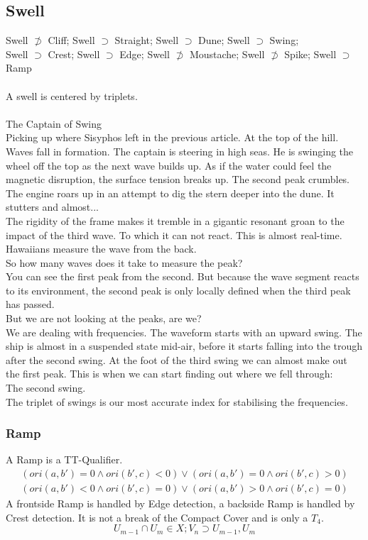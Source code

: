 \documentclass{report}
\begin{document}
\subsection{Swell}
Swell $\not\supset$ Cliff; Swell $\supset$ Straight; Swell $\supset$ Dune; Swell $\supset$ Swing;\\ Swell $\supset$ Crest; Swell $\supset$ Edge; Swell $\not \supset$ Moustache; Swell $\not \supset$ Spike; Swell $\supset$ Ramp\\\\
A swell is centered by triplets.\\\\
The Captain of Swing\\
Picking up where Sisyphos left in the previous article. At the top of the hill. Waves fall in formation. The captain is steering in high seas. He is swinging the wheel off the top as the next wave builds up. As if the water could feel the magnetic disruption, the surface tension breaks up. The second peak crumbles. The engine roars up in an attempt to dig the stern deeper into the dune. It stutters and almost...\\
The rigidity of the frame makes it tremble in a gigantic resonant groan to the impact of the third wave. To which it can not react. This is almost real-time. Hawaiians measure the wave from the back.\\
So how many waves does it take to measure the peak?\\
You can see the first peak from the second. But because the wave segment reacts to its environment, the second peak is only locally defined when the third peak has passed.\\
But we are not looking at the peaks, are we?\\
We are dealing with frequencies. The waveform starts with an upward swing. The ship is almost in a suspended state mid-air, before it starts falling into the trough after the second swing. At the foot of the third swing we can almost make out the first peak. This is when we can start finding out where we fell through:\\
The second swing.\\
The triplet of swings is our most accurate index for stabilising the frequencies.
\subsubsection{Ramp}
A Ramp is a TT-Qualifier.
\begin{align}
(ori(a,b')=0\land ori(b',c)<0)\lor (ori(a,b')=0\land ori(b',c)>0)\\
(ori(a,b')<0\land ori(b',c)=0)\lor (ori(a,b')>0\land ori(b',c)=0)
\end{align}
A frontside Ramp is handled by Edge detection, a backside Ramp is handled by Crest detection. It is not a break of the Compact Cover and is only a $T_{4}$.
\begin{equation}
U_{m-1}\cap U_{m}\in X; V_{n}\supset U_{m-1},U_{m}
\end{equation}
\end{document}
